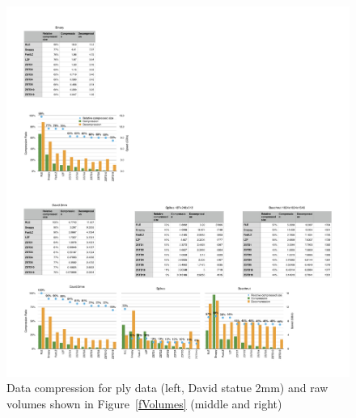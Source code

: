 \documentclass[10pt,journal,compsoc]{IEEEtran}
\newcommand{\fig}[1]{Figure~\ref{#1}}
\begin{document}
\begin{figure}[ht]\center
  \includegraphics[width=\textwidth]{images/compressorDetail}
  \caption{\label{fCompressorDetail}Data compression for ply data (left, David
    statue 2mm) and raw volumes shown in \fig{fVolumes} (middle and right)}
\end{figure}
\end{document}

